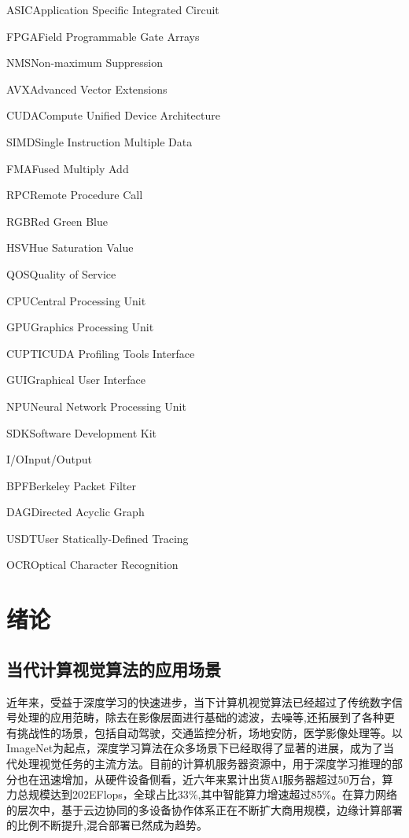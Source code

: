 \documentclass[master,anonymous]{shtthesis}
\makeatletter
\def\ifgraduate{\ifsht@graduate}
\makeatother
\begin{document}
\ifgraduate
\begin{nomenclatures}[缩写]
  \item{ASIC}{Application Specific Integrated Circuit}
  \item{FPGA}{Field Programmable Gate Arrays}
  \item{NMS}{Non-maximum Suppression}
  \item{AVX}{Advanced Vector Extensions}
  \item{CUDA}{Compute Unified Device Architecture}
  \item{SIMD}{Single Instruction Multiple Data}
  \item{FMA}{Fused Multiply Add}
  \item{RPC}{Remote Procedure Call}
  \item{RGB}{Red Green Blue}
  \item{HSV}{Hue Saturation Value}
  \item{QOS}{Quality of Service}
  \item{CPU}{Central Processing Unit}
  \item{GPU}{Graphics Processing Unit}
  \item{CUPTI}{CUDA Profiling Tools Interface}
  \item{GUI}{Graphical User Interface}
  \item{NPU}{Neural Network Processing Unit}
  \item{SDK}{Software Development Kit}
  \item{I/O}{Input/Output}
  \item{BPF}{Berkeley Packet Filter}
  \item{DAG}{Directed Acyclic Graph}
  \item{USDT}{User Statically-Defined Tracing}
  \item{OCR}{Optical Character Recognition}
\end{nomenclatures}

\fi

\mainmatter
\chapter{绪论}

\section{当代计算视觉算法的应用场景}\label{当代计算视觉算法的应用场景}

近年来，受益于深度学习\cite{lecun2015deep}的快速进步，当下计算机视觉算法已经超过了传统数字信号处理的应用范畴，除去在影像层面进行基础的滤波，去噪等\cite{dabov2007image},还拓展到了各种更有挑战性的场景，包括自动驾驶\cite{chen2015deepdriving}，交通监控分析\cite{santos2020real}，场地安防\cite{wang2019deep}，医学影像处理\cite{litjens2017survey}等。以ImageNet\cite{deng2009imagenet}为起点，深度学习算法在众多场景下已经取得了显著的进展，成为了当代处理视觉任务的主流方法。目前的计算机服务器资源中，用于深度学习推理的部分也在迅速增加，从硬件设备侧看，近六年来累计出货AI服务器超过50万台，算力总规模达到202EFlops，全球占比33$\%$,其中智能算力增速超过85$\%$\cite{china2022}。在算力网络的层次中，基于云边协同的多设备协作体系正在不断扩大商用规模，边缘计算部署的比例不断提升,混合部署已然成为趋势。
\end{document}
